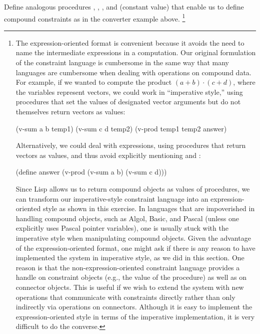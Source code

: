 \begin{exercise}
	Define analogous procedures , , , and  (constant value) that enable us to define compound constraints as in the converter example above.%
	\footnote{
		The expression-oriented format is convenient because it avoids the need to name the intermediate expressions in a computation.
		Our original formulation of the constraint language is cumbersome in the same way that many languages are cumbersome when dealing with operations on compound data.
		For example, if we wanted to compute the product \( (a + b) ⋅ (c + d) \), where the variables represent vectors, we could work in “imperative style,” using procedures that set the values of designated vector arguments but do not themselves return vectors as values:
		\begin{smallexample}
		  (v-sum a b temp1)
		  (v-sum c d temp2)
		  (v-prod temp1 temp2 answer)
		\end{smallexample}
		Alternatively, we could deal with expressions, using procedures that return vectors as values, and thus avoid explicitly mentioning  and :
		\begin{smallexample}
		  (define answer (v-prod (v-sum a b) (v-sum c d)))
		\end{smallexample}
		Since Lisp allows us to return compound objects as values of procedures, we can transform our imperative-style constraint language into an expression-oriented style as shown in this exercise.
		In languages that are impoverished in handling compound objects, such as Algol, Basic, and Pascal (unless one explicitly uses Pascal pointer variables), one is usually stuck with the imperative style when manipulating compound objects.
		Given the advantage of the expression-oriented format, one might ask if there is any reason to have implemented the system in imperative style, as we did in this section.
		One reason is that the non-expression-oriented constraint language provides a handle on constraint objects (e.g., the value of the  procedure) as well as on connector objects.
		This is useful if we wish to extend the system with new operations that communicate with constraints directly rather than only indirectly via operations on connectors.
		Although it is easy to implement the expression-oriented style in terms of the imperative implementation, it is very difficult to do the converse.
	}
\end{exercise}
